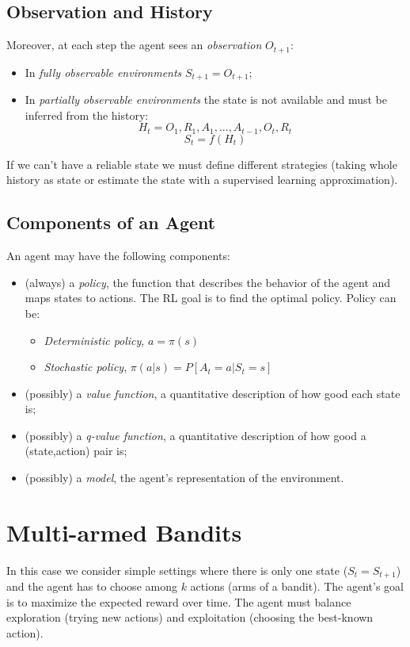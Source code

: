 \subsection{Observation and History}
Moreover, at each step the agent sees an \textit{observation} $O_{t+1}$:
\begin{itemize}
    \item In \textit{fully observable environments} $S_{t+1}=O_{t+1}$;
    \item In \textit{partially observable environments} the state is not available and must be inferred from the history:
    \[H_t=O_1,R_1,A_1,...,A_{t-1},O_t,R_t\]\[S_t=f(H_t)\] 
\end{itemize}
If we can't have a reliable state we must define different strategies (taking whole history as state or estimate the state with a supervised learning approximation).

\subsection{Components of an Agent}
An agent may have the following components:
\begin{itemize}
    \item (always) a \textit{policy}, the function that describes the behavior of the agent and maps states to actions. The RL goal is to find the optimal policy. Policy can be:
        \begin{itemize}
            \item \textit{Deterministic policy}, $a=\pi(s)$
            \item \textit{Stochastic policy}, $\pi(a|s)=P[A_t=a|S_t=s]$
        \end{itemize}
    \item (possibly) a \textit{value function}, a quantitative description of how good each state is;
    \item (possibly) a \textit{q-value function}, a quantitative description of how good a (state,action) pair is;
    \item (possibly) a \textit{model}, the agent's representation of the environment.
\end{itemize}

\section{Multi-armed Bandits}
In this case we consider simple settings where there is only one state ($S_t=S_{t+1}$) and the agent has to choose among $k$ actions (arms of a bandit). The agent's goal is to maximize the expected reward over time. The agent must balance exploration (trying new actions) and exploitation (choosing the best-known action).


